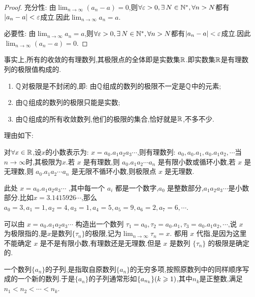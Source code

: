 \begin{proof}
    充分性: 由$\lim_{n \to \infty} (a_n - a) = 0$,则$\forall \ve > 0, \exists N \in \mathbb{N}^*, \forall n > N$都有$|a_n - a| < \varepsilon$成立.因此$\lim_{n \to \infty} a_n = a$.

    必要性: 由$\lim_{n \to \infty} a_n = a$,则$\forall \ve > 0, \exists N \in \mathbb{N}^*, \forall n > N$都有$|a_n - a| < \varepsilon$成立.因此$\lim_{n \to \infty} (a_n - a) = 0$.
\end{proof}

事实上,所有的收敛的有理数列,其极限点的全体即是实数集$\mathbb{R}$.即实数集$\mathbb{R}$是有理数列的极限值构成的.

\begin{remark}
    \begin{enumerate}
        \item $\mathbb{Q}$对极限是不封闭的,即: 由$\mathbb{Q}$组成的数列的极限不一定是$\mathbb{Q}$中的元素;
        \item 由$\mathbb{Q}$组成的数列的极限只能是实数;
        \item 由$\mathbb{Q}$组成的所有收敛数列,他们的极限的集合,恰好就是$\mathbb{R}$,不多不少.
    \end{enumerate}

    理由如下:

    对$\forall x\in \mathbb{R}$,设$x$的小数表示为: $x=a_0 . a_1 a_2 a_3 \cdots$,则有理数列: $a_0, a_0 . a_1, a_0 . a_1 a_2, \cdots$当$n\rightarrow \infty$时,其极限为$x$.若 $x$ 是有理数,则 $a_0 . a_1 a_2 \cdots a_n$ 是有限小数或循环小数,若 $x$ 是无理数,则 $a_0 . a_1 a_2 \cdots a_n$ 是无限不循环小数,则极限点 $x$ 是无理数.

    此处 $x=a_0 . a_1 a_2 a_3 \cdots$ ,其中每一个 $a_i$ 都是一个数字,$a_0$ 是整数部分,$a_1 a_2 a_3 \cdots$是小数部分.比如$x=3.1415926\cdots$,那么 $a_0=3, a_1=1, a_2=4, a_3=1, a_4=5, a_5=9, a_6=2, a_7=6,\cdots$.

    可以由 $x=a_0 . a_1 a_2 a_3 \cdots$ 构造出一个数列 $\tau_1 = a_0, \tau_2 = a_0 . a_1, \tau_3 = a_0 . a_1 a_2, \cdots$,说 $x$ 为极限指的,是$x$是数列$\{\tau_n\}$的极限,记为$\lim_{n \to \infty} \tau_n = x$.
    都用 $x$ 代指,是因为这里不能确定 $x$ 是不是有限小数,有理数还是无理数.但是 $x$ 是数列 $\{\tau_n\}$ 的极限是确定的.

\end{remark}

\begin{definition}
    [子列]

    一个数列$\{a_n\}$的子列,是指取自原数列$\{a_n\}$的无穷多项,按照原数列中的同样顺序写成的一个新的数列.于是$\{a_n\}$的子列通常形如$\{a_{n_k}\} (k \geqslant 1)$,其中$n_k$是正整数,满足$n_1 < n_2 < \cdots < n_k$.
\end{definition}

